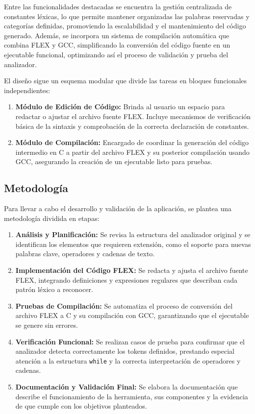 \documentclass{article}
\begin{document}
Entre las funcionalidades destacadas se encuentra la gestión centralizada de constantes léxicas, lo que permite mantener organizadas las palabras reservadas y categorías definidas, promoviendo la escalabilidad y el mantenimiento del código generado. Además, se incorpora un sistema de compilación automática que combina FLEX y GCC, simplificando la conversión del código fuente en un ejecutable funcional, optimizando así el proceso de validación y prueba del analizador.

El diseño sigue un esquema modular que divide las tareas en bloques funcionales independientes:

\begin{enumerate}
    \item \textbf{Módulo de Edición de Código:} Brinda al usuario un espacio para redactar o ajustar el archivo fuente FLEX. Incluye mecanismos de verificación básica de la sintaxis y comprobación de la correcta declaración de constantes.
    \item \textbf{Módulo de Compilación:} Encargado de coordinar la generación del código intermedio en C a partir del archivo FLEX y su posterior compilación usando GCC, asegurando la creación de un ejecutable listo para pruebas.
\end{enumerate}

\subsection{Metodología}

Para llevar a cabo el desarrollo y validación de la aplicación, se plantea una metodología dividida en etapas:

\begin{enumerate}
    \item \textbf{Análisis y Planificación:} Se revisa la estructura del analizador original y se identifican los elementos que requieren extensión, como el soporte para nuevas palabras clave, operadores y cadenas de texto.
    \item \textbf{Implementación del Código FLEX:} Se redacta y ajusta el archivo fuente FLEX, integrando definiciones y expresiones regulares que describan cada patrón léxico a reconocer.
    \item \textbf{Pruebas de Compilación:} Se automatiza el proceso de conversión del archivo FLEX a C y su compilación con GCC, garantizando que el ejecutable se genere sin errores.
    \item \textbf{Verificación Funcional:} Se realizan casos de prueba para confirmar que el analizador detecta correctamente los tokens definidos, prestando especial atención a la estructura \texttt{while} y la correcta interpretación de operadores y cadenas.
    \item \textbf{Documentación y Validación Final:} Se elabora la documentación que describe el funcionamiento de la herramienta, sus componentes y la evidencia de que cumple con los objetivos planteados.
\end{enumerate}
\end{document}
